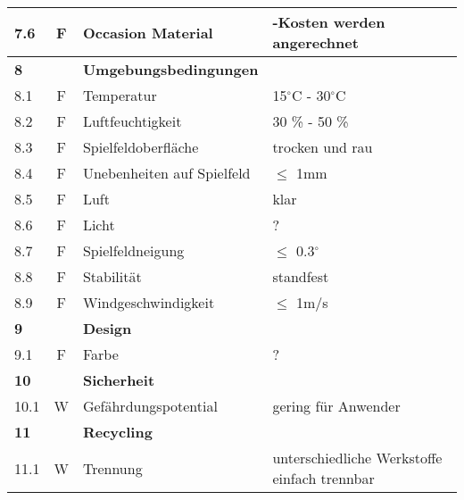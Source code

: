 \begin{longtable}[l]{|l|c|l|X|}
	\hline 7.6 & F & Occasion Material & \textonehalf-Kosten werden angerechnet \\
	\hline \textbf{8} &  & \textbf{Umgebungsbedingungen} & \\
	\hline 8.1 & F & Temperatur & 15$^\circ$C - 30$^\circ$C \\
	\hline 8.2 & F & Luftfeuchtigkeit & 30 \% - 50 \% \\
	\hline 8.3 & F & Spielfeldoberfläche & trocken und rau \\
	\hline 8.4 & F & Unebenheiten auf Spielfeld & $\leq$ 1mm \\
	\hline 8.5 & F & Luft & klar \\
	\hline 8.6 & F & Licht & ? \\
	\hline 8.7 & F & Spielfeldneigung & $\leq$ 0.3$^\circ$ \\
	\hline 8.8 & F & Stabilität & standfest \\
	\hline 8.9 & F & Windgeschwindigkeit & $\leq$ 1m/s \\
	\hline \textbf{9} &  & \textbf{Design} & \\	
	\hline 9.1 & F & Farbe & ? \\
	\hline \textbf{10} &  & \textbf{Sicherheit} & \\
	\hline 10.1 & W & Gefährdungspotential & gering für Anwender \\
	\hline \textbf{11} &  & \textbf{Recycling} & \\
	\hline 11.1 & W & Trennung & unterschiedliche Werkstoffe einfach trennbar \\
	\hline 
\end{longtable}